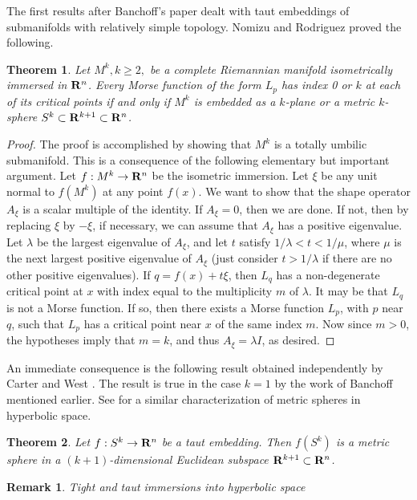 \documentclass[12pt]{article}
\newtheorem{theorem}{Theorem}[section]
\newtheorem{remark}{Remark}[section]
\begin{document}
{The first results after Banchoff's paper dealt with taut embeddings
of submanifolds with relatively simple topology.  Nomizu and
Rodriguez \cite{NR} proved the following.
\begin{theorem}
\label{thm:nomizu-rodriguez}
Let $M^k, k \geq 2,$ be a complete Riemannian manifold
isometrically immersed in  ${\bf R}^n$.
Every Morse function of the form $L_p$ has index 0 or $k$ at each of its critical points if and only if $M^k$
is embedded as a $k$-plane or a
metric $k$-sphere $S^k \subset {\bf R}^{k+1} \subset {\bf R}^n$.
\end{theorem}
\begin{proof}
The proof is accomplished by showing that $M^k$ is a totally
umbilic submanifold.  This is a consequence of the
following elementary but important argument.  Let $f:M^k \rightarrow
{\bf R}^n$ be the isometric immersion.
Let $\xi$
be any unit normal to $f(M^k)$ at any point $f(x)$.  
We want to show that 
the shape operator $A_{\xi}$ is a scalar multiple of the identity.
If $A_{\xi}=0$, then we are done.  If not, then by replacing
$\xi$ by $-\xi$, if necessary, we can assume that $A_{\xi}$ has
a positive eigenvalue.  Let $\lambda$ be the largest eigenvalue
of $A_{\xi}$, and let $t$ satisfy $1/\lambda <t< 1/\mu$, where
$\mu$ is the next largest positive eigenvalue of $A_{\xi}$
(just consider $t > 1/\lambda$ if there are no other positive
eigenvalues).  If $q=f(x) + t\xi$, then $L_q$ has a non-degenerate
critical point at $x$ with index equal to the multiplicity $m$
of $\lambda$.  It may be that $L_q$ is not a Morse function. If so, 
then there exists a Morse function
$L_p$, with $p$ near $q$, such that $L_p$ has a critical 
point near $x$ of the same index $m$. Now since $m>0$,
the hypotheses imply that $m=k$, and thus $A_{\xi} = \lambda I$,
as desired.
\end{proof}

An immediate consequence is the following result obtained
independently by Carter and West \cite{CW1}. The result
is true in the case $k=1$ by the work of Banchoff mentioned 
earlier.  See \cite{CecToh} for a similar characterization
of metric spheres in hyperbolic space.
\begin{theorem}
\label{thm:carter-west-taut-spheres}
Let $f:S^k \rightarrow {\bf R}^n$ be a taut embedding.
Then $f(S^k)$ is a metric sphere in a $(k+1)$-dimensional
Euclidean subspace ${\bf R}^{k+1} \subset {\bf R}^n$.
\end{theorem}


\begin{remark}{Tight and taut immersions into hyperbolic space}
\label{rem:tight-taut-hyp-space}


\end{remark}}
\end{document}
